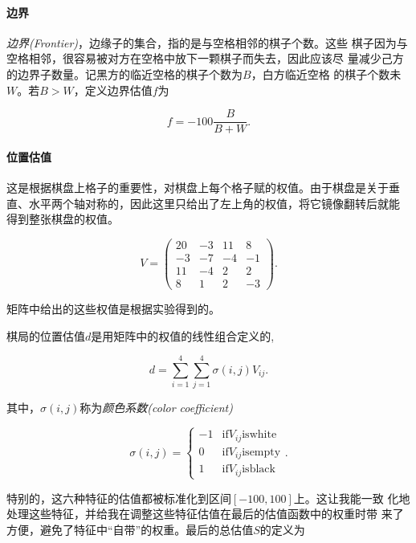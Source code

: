 \documentclass[oneside,a4paper]{article}
\begin{document}
\paragraph{边界}
\emph{边界(Frontier)}，边缘子的集合，指的是与空格相邻的棋子个数。这些
棋子因为与空格相邻，很容易被对方在空格中放下一颗棋子而失去，因此应该尽
量减少己方的边界子数量。记黑方的临近空格的棋子个数为$B$，白方临近空格
的棋子个数未$W$。若$B>W$，定义边界估值$f$为

\begin{equation}f = -100 \frac{B}{B+W}   \mathrm{ .}
\end{equation}

\paragraph{位置估值}
这是根据棋盘上格子的重要性，对棋盘上每个格子赋的权值。由于棋盘是关于垂
直、水平两个轴对称的，因此这里只给出了左上角的权值，将它镜像翻转后就能
得到整张棋盘的权值。

\begin{equation}
 V =  \begin{pmatrix}
    20 & -3 & 11 & 8\\
    -3 & -7 & -4 & -1 \\
    11 & -4 & 2 & 2\\
    8 & 1 & 2 & -3 \end{pmatrix}
  \mathrm{ .}
\end{equation}

矩阵中给出的这些权值是根据实验得到的。

棋局的位置估值$d$是用矩阵中的权值的线性组合定义的,

\begin{equation}
  d = \sum_{i=1}^4\sum_{j=1}^4\sigma(i,j)V_{ij}
  \mathrm{ .}
\end{equation}

其中，$\sigma(i, j)$称为\emph{颜色系数(color coefficient)}

\begin{equation}
  \sigma(i, j)=\left\{
    \begin{array}{cl}
      -1 & \mathrm{if } V_{ij} \mathrm{ is white}\\
      0 & \mathrm{if } V_{ij} \mathrm{ is empty} \\
      1 & \mathrm{if } V_{ij} \mathrm{ is black}
    \end{array}
  \right.
  \mathrm{ .}
\end{equation}


特别的，这六种特征的估值都被标准化到区间$[-100, 100]$上。这让我能一致
化地处理这些特征，并给我在调整这些特征估值在最后的估值函数中的权重时带
来了方便，避免了特征中``自带''的权重。最后的总估值$S$的定义为
\end{document}
